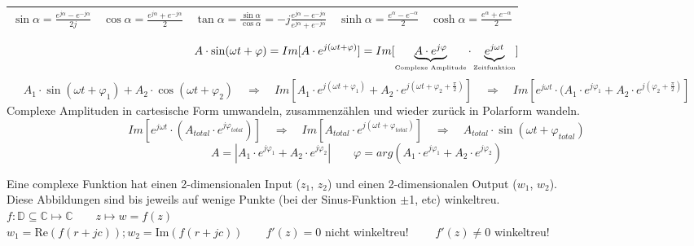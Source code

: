 \newpage
{}
\renewcommand{\arraystretch}{1.5}
\begin{tabular}{| l | l | l | l | l |}
\hline
	$\sin{\alpha} = \frac{e^{j\alpha} - e^{-j\alpha}}{2j}$ &

	$\cos{\alpha} = \frac{e^{j\alpha} + e^{-j\alpha}}{2}$ &

	$\tan{\alpha} = \frac{\sin \alpha}{\cos \alpha} = -j \frac{e^{j\alpha}-e^{-j\alpha}}{e^{j\alpha}+e^{-j\alpha}}$ & 

	$\sinh{\alpha} = \frac{e^\alpha - e^{-\alpha}}{2} $ &

	$\cosh{\alpha} = \frac{e^\alpha + e^{-\alpha}}{2} $\\
\hline
\end{tabular}
\renewcommand{\arraystretch}{1}

$$A \cdot \sin(\omega t + \varphi) = Im[A \cdot e^{j(\omega t + \varphi)}] =
Im[\underbrace{A \cdot e^{j\varphi}}_{\text{\tiny{Complexe Amplitude}}}
\cdot \underbrace{e^{j\omega t}}_{\text{\tiny{Zeitfunktion}}}]$$
%
%
$$ A_1 \cdot \sin(\omega t + \varphi_1) + A_2 \cdot \cos(\omega t + \varphi_2) 
 \quad \Rightarrow \quad 
 Im[A_1 \cdot e^{j(\omega t + \varphi_1)} + A_2 \cdot e^{j (\omega t + \varphi_2
 + \frac{\pi}{2})}] \quad \Rightarrow \quad 
 Im[e^{j \omega t} \cdot  (A_1 \cdot e^{j \varphi_1} + A_2 \cdot e^{j (\varphi_2
 + \frac{\pi}{2})}]$$ 
Complexe Amplituden in cartesische Form umwandeln, zusammenzählen und wieder
zurück in Polarform wandeln.
$$ Im[e^{j \omega t} \cdot  (A_{total} \cdot e^{j \varphi_{total}})] 
 \quad \Rightarrow \quad 
 Im[A_{total} \cdot e^{j (\omega t + \varphi_{total})}] 
 \quad \Rightarrow \quad 
 A_{total} \cdot \sin(\omega t + \varphi_{total})$$ 
$$A = |A_1 \cdot e^{j\varphi_1} + A_2 \cdot e^{j\varphi_2}| \qquad \varphi = arg(A_1 \cdot e^{j\varphi_1} + A_2 \cdot e^{j\varphi_2})$$


{}
Eine complexe Funktion hat einen 2-dimensionalen Input ($z_1$, $z_2$) und einen
2-dimensionalen Output ($w_1$, $w_2$). \\
Diese Abbildungen sind bis jeweils auf wenige Punkte (bei der Sinus-Funktion
$\pm$1, etc) winkeltreu.\\
$ f: \mathbb{D} \subseteq \mathbb{C} \mapsto \mathbb{C} \qquad z  \mapsto w = f(z)$\\
$w_1 = \text{Re}(f(r+jc)); w_2 = \text{Im}(f(r+jc)) \qquad f'(z) = 0$ nicht winkeltreu! $\qquad f'(z) \neq 0$ winkeltreu! 
 

